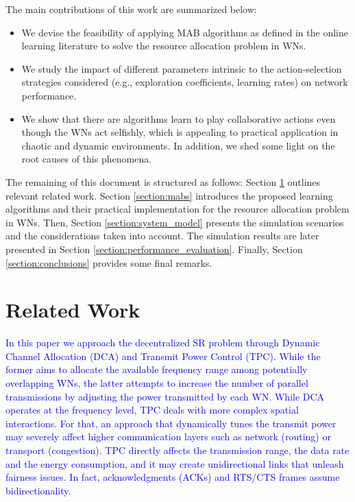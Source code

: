 \documentclass[preprint,12pt]{elsarticle}
\newcommand{\francesc}[1]{\textcolor{blue}{#1}}
\begin{document}
The main contributions of this work are summarized below:
\begin{itemize}		
	\item We devise the feasibility of applying MAB algorithms as defined in the online learning literature to solve the resource allocation problem in WNs.
	\item We study the impact of different parameters intrinsic to the action-selection strategies considered (e.g., exploration coefficients, learning rates) on network performance.
	\item We show that there are algorithms learn to play collaborative actions even though the WNs act selfishly, which is appealing to practical application in chaotic and dynamic environments. In addition, we shed some light on the root causes of this phenomena. 
\end{itemize}

The remaining of this document is structured as follows: Section \ref{section:related_work} outlines relevant related work. Section \ref{section:mabs} introduces the proposed learning algorithms and their practical implementation for the resource allocation problem in WNs. Then, Section \ref{section:system_model} presents the simulation scenarios and the considerations taken into account. The simulation results are later presented in Section \ref{section:performance_evaluation}. Finally, Section \ref{section:conclusions} provides some final remarks.
	
\section{Related Work}
\label{section:related_work} 		
\francesc{In this paper we approach the decentralized SR problem through Dynamic Channel Allocation (DCA) and Transmit Power Control (TPC). While the former aims to allocate the available frequency range among potentially overlapping WNs, the latter attempts to increase the number of parallel transmissions by adjusting the power transmitted by each WN. While DCA operates at the frequency level, TPC deals with more complex spatial interactions. For that, an approach that dynamically tunes the transmit power may severely affect higher communication layers such as network (routing) or transport (congestion). TPC directly affects the transmission range, the data rate and the energy consumption, and it may create unidirectional links that unleash fairness issues. In fact, acknowledgments (ACKs) and RTS/CTS frames assume bidirectionality.} 
\end{document}
